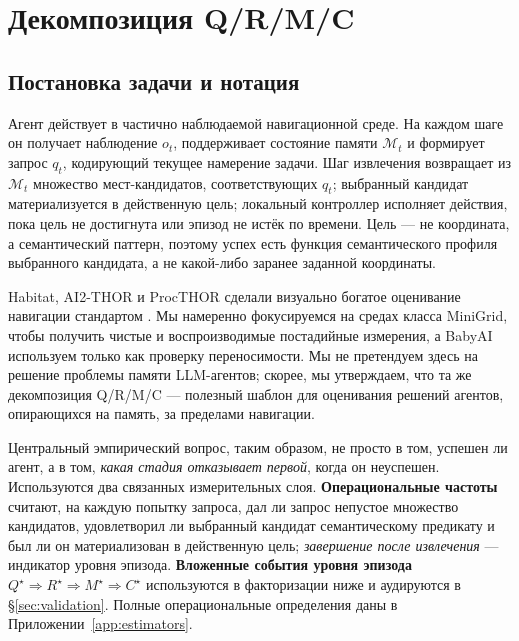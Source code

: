 \documentclass{article}
\begin{document}
\section{Декомпозиция Q/R/M/C}
\label{sec:framework}

\subsection{Постановка задачи и нотация}
\label{sec:notation}

Агент действует в частично наблюдаемой навигационной среде.
На каждом шаге он получает наблюдение $o_t$, поддерживает состояние памяти
$\mathcal{M}_t$ и формирует запрос $q_t$, кодирующий текущее
намерение задачи. Шаг извлечения возвращает из $\mathcal{M}_t$ множество мест-кандидатов,
соответствующих $q_t$; выбранный кандидат
материализуется в действенную цель; локальный контроллер исполняет
действия, пока цель не достигнута или эпизод не истёк по времени.
Цель --- не координата, а семантический паттерн, поэтому успех есть
функция семантического профиля выбранного кандидата, а не какой-либо
заранее заданной координаты.

Habitat, AI2-THOR и ProcTHOR сделали визуально богатое оценивание навигации
стандартом
\citep{savva2019habitat,kolve2017ai2thor,deitke2022procthor}. Мы
намеренно фокусируемся на средах класса MiniGrid, чтобы получить чистые и
воспроизводимые постадийные измерения, а BabyAI используем только как проверку
переносимости. Мы не претендуем здесь на решение проблемы памяти LLM-агентов; скорее, мы
утверждаем, что та же декомпозиция Q/R/M/C --- полезный шаблон для
оценивания решений агентов, опирающихся на память, за пределами навигации.

Центральный эмпирический вопрос, таким образом, не просто в том, успешен ли агент,
а в том, \emph{какая стадия отказывает первой}, когда он неуспешен. Используются два
связанных измерительных слоя. \textbf{Операциональные частоты} считают,
на каждую попытку запроса, дал ли запрос непустое множество кандидатов,
удовлетворил ли выбранный кандидат семантическому предикату
и был ли он материализован в действенную цель;
\emph{завершение после извлечения} --- индикатор уровня эпизода.
\textbf{Вложенные события уровня эпизода}
$Q^\star \Rightarrow R^\star \Rightarrow M^\star \Rightarrow C^\star$
используются в факторизации ниже и аудируются в
\S\ref{sec:validation}. Полные операциональные определения даны в
Приложении~\ref{app:estimators}.
\end{document}
